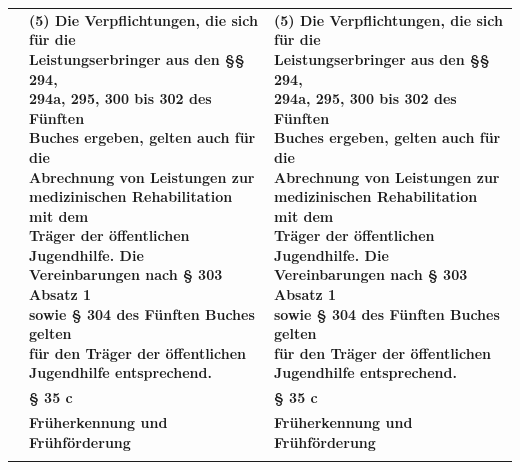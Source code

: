 \documentclass[10pt,a4paper,landscape]{article}
\begin{document}
\begin{longtable}{|L{8.2cm}|L{8.2cm}|L{8.2cm}|}
\hhline{|---|}
 & \textbf{(5) Die Verpflichtungen, die sich für die  \newline Leistungserbringer aus den \S{}\S{} 294,  \newline 294a, 295, 300 bis 302 des Fünften  \newline Buches ergeben, gelten auch für die  \newline Abrechnung von Leistungen zur  \newline medizinischen Rehabilitation mit dem  \newline Träger der öffentlichen Jugendhilfe. Die  \newline Vereinbarungen nach \S{} 303 Absatz 1  \newline sowie \S{} 304 des Fünften Buches gelten  \newline für den Träger der öffentlichen  \newline Jugendhilfe entsprechend. } & \textbf{(5) Die Verpflichtungen, die sich für die  \newline Leistungserbringer aus den \S{}\S{} 294,  \newline 294a, 295, 300 bis 302 des Fünften  \newline Buches ergeben, gelten auch für die  \newline Abrechnung von Leistungen zur  \newline medizinischen Rehabilitation mit dem  \newline Träger der öffentlichen Jugendhilfe. Die  \newline Vereinbarungen nach \S{} 303 Absatz 1  \newline sowie \S{} 304 des Fünften Buches gelten  \newline für den Träger der öffentlichen  \newline Jugendhilfe entsprechend. } \\
\hhline{|---|}
 & \textbf{\S{} 35 c } & \textbf{\S{} 35 c } \\
\hhline{|---|}
 & \textbf{Früherkennung und Frühförderung} & \textbf{Früherkennung und Frühförderung} \\
\hhline{|---|}

\end{longtable}
\end{document}
